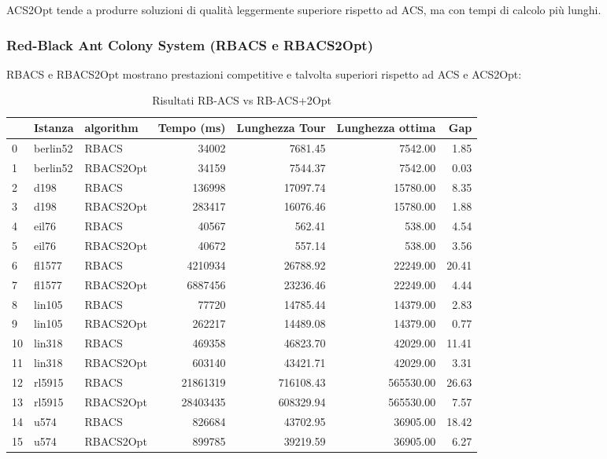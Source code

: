 ACS2Opt tende a produrre soluzioni di qualità leggermente superiore rispetto ad ACS, ma con tempi di calcolo più lunghi.

\subsubsection{Red-Black Ant Colony System (RBACS e RBACS2Opt)}
RBACS e RBACS2Opt mostrano prestazioni competitive e talvolta superiori rispetto ad ACS e ACS2Opt:


\begin{table}[H]
	\centering
	\caption{Risultati RB-ACS vs RB-ACS+2Opt}
	\begin{tabular}{lllrrrr}
		\toprule
		   & Istanza  & algorithm & Tempo (ms) & Lunghezza Tour & Lunghezza ottima & Gap   \\
		\midrule
		0  & berlin52 & RBACS     & 34002      & 7681.45        & 7542.00          & 1.85  \\
		1  & berlin52 & RBACS2Opt & 34159      & 7544.37        & 7542.00          & 0.03  \\
		2  & d198     & RBACS     & 136998     & 17097.74       & 15780.00         & 8.35  \\
		3  & d198     & RBACS2Opt & 283417     & 16076.46       & 15780.00         & 1.88  \\
		4  & eil76    & RBACS     & 40567      & 562.41         & 538.00           & 4.54  \\
		5  & eil76    & RBACS2Opt & 40672      & 557.14         & 538.00           & 3.56  \\
		6  & fl1577   & RBACS     & 4210934    & 26788.92       & 22249.00         & 20.41 \\
		7  & fl1577   & RBACS2Opt & 6887456    & 23236.46       & 22249.00         & 4.44  \\
		8  & lin105   & RBACS     & 77720      & 14785.44       & 14379.00         & 2.83  \\
		9  & lin105   & RBACS2Opt & 262217     & 14489.08       & 14379.00         & 0.77  \\
		10 & lin318   & RBACS     & 469358     & 46823.70       & 42029.00         & 11.41 \\
		11 & lin318   & RBACS2Opt & 603140     & 43421.71       & 42029.00         & 3.31  \\
		12 & rl5915   & RBACS     & 21861319   & 716108.43      & 565530.00        & 26.63 \\
		13 & rl5915   & RBACS2Opt & 28403435   & 608329.94      & 565530.00        & 7.57  \\
		14 & u574     & RBACS     & 826684     & 43702.95       & 36905.00         & 18.42 \\
		15 & u574     & RBACS2Opt & 899785     & 39219.59       & 36905.00         & 6.27  \\
		\bottomrule
	\end{tabular}
\end{table}

